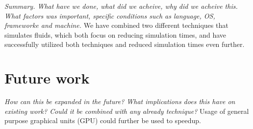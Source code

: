 \documentclass[../main.tex]{subfiles}
\begin{document}
\textit{Summary. What have we done, what did we acheive, why did we acheive this. What factors was important, specific conditions such as language, OS, frameworke and machine.}
We have combined two different techniques that simulates fluids, which both focus on reducing simulation times, and have successfully utilized both techniques and reduced simulation times even further.


\section{Future work}
\textit{How can this be expanded in the future? What implications does this have on existing work? Could it be combined with any already technique?}
Usage of general purpose graphical units (GPU) could further be used to speedup. 
\end{document}
